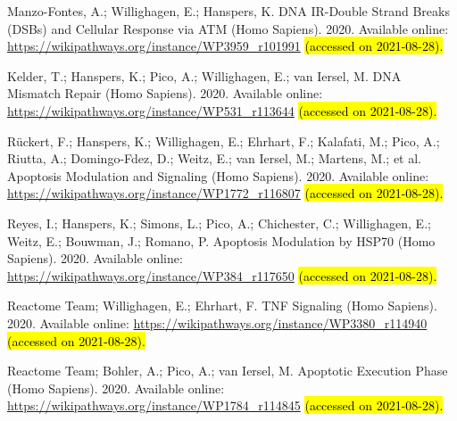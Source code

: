 \documentclass[ijms,article,accept,moreauthors,pdftex]{Definitions/mdpi}
\begin{document}
\begin{thebibliography}{999}
Manzo-Fontes, A.; Willighagen, E.; Hanspers, K.
\newblock DNA IR-Double Strand Breaks (DSBs) and Cellular Response via ATM
  (Homo Sapiens).  2020.
\newblock Available online: \url{https://wikipathways.org/instance/WP3959_r101991} \hl{(accessed on 2021-08-28). } %

Kelder, T.; Hanspers, K.; Pico, A.; Willighagen, E.; van Iersel, M.
\newblock DNA Mismatch Repair (Homo Sapiens).  2020.
\newblock Available online: \url{https://wikipathways.org/instance/WP531_r113644} \hl{(accessed on 2021-08-28). } %

Rückert, F.; Hanspers, K.; Willighagen, E.; Ehrhart, F.; Kalafati, M.; Pico,
  A.; Riutta, A.; Domingo-Fdez, D.; Weitz, E.;  van Iersel, M.;
  Martens, M.; et al.
\newblock Apoptosis Modulation and Signaling (Homo Sapiens).  2020.
\newblock Available online: \url{https://wikipathways.org/instance/WP1772_r116807} \hl{(accessed on 2021-08-28). } %

Reyes, I.; Hanspers, K.; Simons, L.; Pico, A.; Chichester, C.; Willighagen, E.;
  Weitz, E.; Bouwman, J.; Romano, P.
\newblock Apoptosis Modulation by HSP70 (Homo Sapiens).  2020.
\newblock Available online: \url{https://wikipathways.org/instance/WP384_r117650} \hl{(accessed on 2021-08-28). } %

{Reactome Team}; Willighagen, E.; Ehrhart, F.
\newblock TNF Signaling (Homo Sapiens).  2020.
\newblock Available online: \url{https://wikipathways.org/instance/WP3380_r114940} \hl{(accessed on 2021-08-28). } %

{Reactome Team}; Bohler, A.; Pico, A.; van Iersel, M.
\newblock Apoptotic Execution Phase (Homo Sapiens).  2020.
\newblock Available online: \url{https://wikipathways.org/instance/WP1784_r114845} \hl{(accessed on 2021-08-28). } %


\end{thebibliography}
\end{document}
